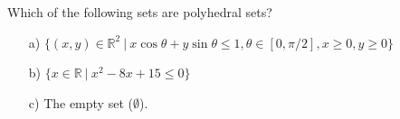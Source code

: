 Which of the following sets are polyhedral sets?

\begin{itemize}
	\item[a)] $\{(x,y)\in\mathbb{R}^2~|~ x \cos \theta + y\sin\theta \leq 1,\theta\in[0,\pi/2],x\geq0,y\geq0\}$
	\item[b)] $\{x\in\mathbb{R}~|~ x^2-8x+15\leq 0\}$
	\item[c)] The empty set ($\emptyset$).
\end{itemize}